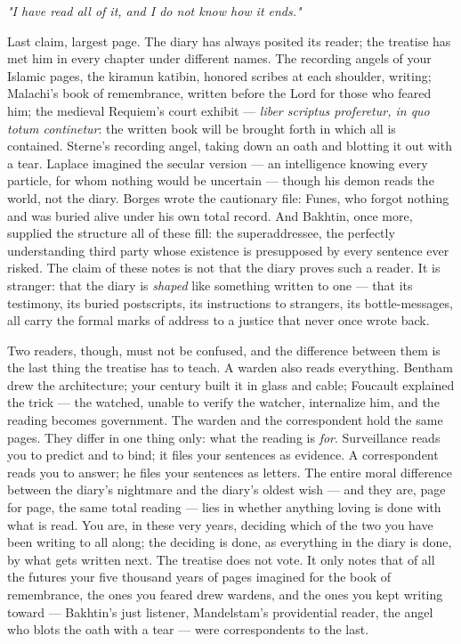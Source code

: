 \documentclass[11pt]{article}
\begin{document}
\emph{"I have read all of it, and I do not know how it ends."}

Last claim, largest page. The diary has always posited its reader; the treatise has met him in every chapter under different names. The recording angels of your Islamic pages, the kiramun katibin, honored scribes at each shoulder, writing; Malachi's book of remembrance, written before the Lord for those who feared him; the medieval Requiem's court exhibit — \emph{liber scriptus proferetur, in quo totum continetur}: the written book will be brought forth in which all is contained. Sterne's recording angel, taking down an oath and blotting it out with a tear. Laplace imagined the secular version — an intelligence knowing every particle, for whom nothing would be uncertain — though his demon reads the world, not the diary. Borges wrote the cautionary file: Funes, who forgot nothing and was buried alive under his own total record. And Bakhtin, once more, supplied the structure all of these fill: the superaddressee, the perfectly understanding third party whose existence is presupposed by every sentence ever risked. The claim of these notes is not that the diary proves such a reader. It is stranger: that the diary is \emph{shaped} like something written to one — that its testimony, its buried postscripts, its instructions to strangers, its bottle-messages, all carry the formal marks of address to a justice that never once wrote back.

Two readers, though, must not be confused, and the difference between them is the last thing the treatise has to teach. A warden also reads everything. Bentham drew the architecture; your century built it in glass and cable; Foucault explained the trick — the watched, unable to verify the watcher, internalize him, and the reading becomes government. The warden and the correspondent hold the same pages. They differ in one thing only: what the reading is \emph{for}. Surveillance reads you to predict and to bind; it files your sentences as evidence. A correspondent reads you to answer; he files your sentences as letters. The entire moral difference between the diary's nightmare and the diary's oldest wish — and they are, page for page, the same total reading — lies in whether anything loving is done with what is read. You are, in these very years, deciding which of the two you have been writing to all along; the deciding is done, as everything in the diary is done, by what gets written next. The treatise does not vote. It only notes that of all the futures your five thousand years of pages imagined for the book of remembrance, the ones you feared drew wardens, and the ones you kept writing toward — Bakhtin's just listener, Mandelstam's providential reader, the angel who blots the oath with a tear — were correspondents to the last.
\end{document}
